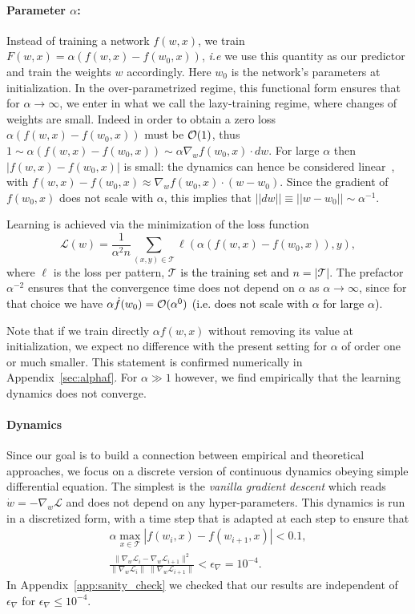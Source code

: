 \documentclass{article}
\newcommand{\be}{\begin{equation}}
\newcommand{\ee}{\end{equation}}
\newcommand{\mm}[1]{\textcolor{black}{#1}}
\renewcommand{\cite}[1]{\citep{#1}}
\newcommand{\mc}{\mathcal}
\newcommand{\abs}[1]{|\!|#1|\!|}
\newcommand{\aref}[1]{Appendix~\ref{#1}}
\begin{document}
\paragraph{Parameter $\alpha$:}
Instead of training a network $f(w,x)$, we train $F(w,x) = \alpha (f(w,x) - f(w_0,x))$,  {\it i.e} we use this quantity as our predictor and train the weights $w$ accordingly. Here $w_0$ is the network's parameters at initialization. In the over-parametrized regime, this functional form ensures that for $\alpha \to \infty$, we enter in what we call the lazy-training regime, where changes of weights are small. Indeed in order to obtain a zero loss $\alpha (f(w,x) - f(w_0,x))$ must be ${\cal O}(1)$, thus $1 \sim \alpha (f(w,x) - f(w_0,x)) \sim \alpha \nabla_w f(w_0, x) \cdot dw$. For large $\alpha$ then $|f(w,x) - f(w_0,x)|$ is small: the dynamics can hence be considered linear~\cite{chizat19}, with $f(w,x) - f(w_0,x) \approx \nabla_w f(w_0,x)\cdot(w-w_0)$. Since the gradient of $f(w_0,x)$ does not scale with $\alpha$, this implies that $\abs{dw} \equiv \abs{w - w_0} \sim \alpha^{-1}$.

Learning is achieved via the minimization of the loss function
\be
\mathcal{L}(w) = \frac{1}{\alpha^2 n} \sum_{(x,y) \in \mc T} \ell(\alpha (f(w, x) - f(w_0, x)), y),
\ee
where $\ell$ is the loss per pattern, \mm{$\mathcal{T}$ is the training set and $n = |\mathcal{T}|$}.
The prefactor $\alpha^{-2}$ ensures that the convergence time does not depend on $\alpha$ as $\alpha \rightarrow \infty$, since for that choice we have $\alpha \dot f(w_0) ={\cal O}(\alpha^0)$ \mm{(i.e. does not scale with $\alpha$ for large $\alpha$)}. 

Note that if we train directly $\alpha f(w,x)$ without removing its value at initialization, we expect no difference with the present setting for $\alpha$ of order one or much smaller. This statement is  confirmed numerically in \aref{sec:alphaf}. For  $\alpha \gg 1$ however, we find empirically that the learning dynamics does not converge.

\paragraph{Dynamics}
Since our goal is to build a connection between empirical and theoretical approaches, we focus on a discrete version
of continuous dynamics obeying simple differential equation. The simplest is the \emph{vanilla gradient descent} which reads $\dot w = - \nabla_w \mathcal L$ and does not depend on any hyper-parameters. 
This dynamics is run in a discretized form, with a time step that is adapted at each step to ensure that
\begin{gather}
\alpha \max_{x \in \mathcal{T}} |f(w_i, x) - f(w_{i+1}, x)| < 0.1, \\
\frac{\| \nabla_w \mathcal L_i - \nabla_w \mathcal L_{i+1} \|^2}{\|\nabla_w \mathcal L_i\| \; \|\nabla_w \mathcal L_{i+1}\|} < \epsilon_\nabla = 10^{-4}.
\label{eq:stepconstraint}
\end{gather}
In \aref{app:sanity_check} we checked that our results are independent of $\epsilon_\nabla$ for  $\epsilon_\nabla\leq 10^{-4}$.%
\end{document}
